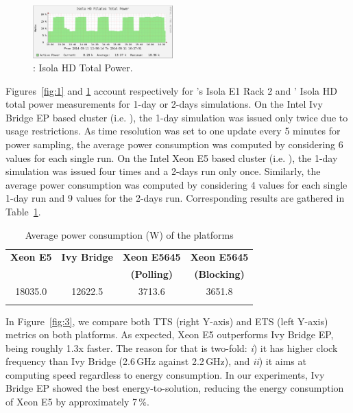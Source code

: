 \begin{figure}[htbf]
  \begin{center}
    \includegraphics[width=0.48\textwidth]{Figs/NRJ_benchmark_Pilatus.eps}
    \caption{\pilat: Isola HD Total Power.}
    \label{fig:2}
  \end{center}
\end{figure}

Figures~\ref{fig:1}   and   \ref{fig:2}   account   respectively   for
\monch's Isola E1 Rack  2 and \pilat' Isola HD total
power measurements for  1-day or 2-days simulations. On  the Intel Ivy
Bridge EP  based cluster (i.e.  \monch),  the 1-day simulation
was issued  only twice due  to usage restrictions. As  time resolution
was set to one update every  5 minutes for power sampling, the average
power consumption was computed by considering 6 values for each single
run.  On the Intel Xeon E5 based cluster (i.e.  \pilat), the
1-day simulation  was issued  four times and  a 2-days run  only once.
Similarly, the average power consumption was computed by considering 4
values  for  each  single  1-day  run  and 9  values  for  the  2-days
run. Corresponding results are gathered in Table~\ref{tab:3}.

\begin{table}[htbf]
  \begin{center}
    \caption{Average power consumption (W) of the platforms}
    \label{tab:3}
    \begin{tabular}{cccc}
      \hline\noalign{\smallskip}
      \textbf{\scriptsize{Xeon E5}} & \textbf{\scriptsize{Ivy Bridge}} & \textbf{\scriptsize{Xeon  E5645}} & \textbf{\scriptsize{Xeon  E5645}}\\
      & & \textbf{\scriptsize{(Polling)}} & \textbf{\scriptsize{(Blocking)}} \\
      \noalign{\smallskip}\hline\noalign{\smallskip}
      18035.0 & 12622.5 & 3713.6 & 3651.8 \\ 
      \noalign{\smallskip}\hline
    \end{tabular}
  \end{center}
\end{table}

In  Figure~\ref{fig:3}, we  compare both  TTS (right  Y-axis)  and ETS
(left  Y-axis)  metrics  on  both  platforms.  As  expected,  Xeon  E5
outperforms Ivy Bridge EP, being  roughly 1.3x faster.  The reason for
that is  two-fold: \emph{i}) it has  higher clock frequency  than Ivy Bridge
(2.6\,GHz  against  2.2\,GHz),  and  \emph{ii})  it  aims at  computing  speed
regardless to  energy consumption.  In our experiments,  Ivy Bridge EP
showed the best energy-to-solution, reducing the energy consumption of
Xeon E5 by approximately 7\,\%.

